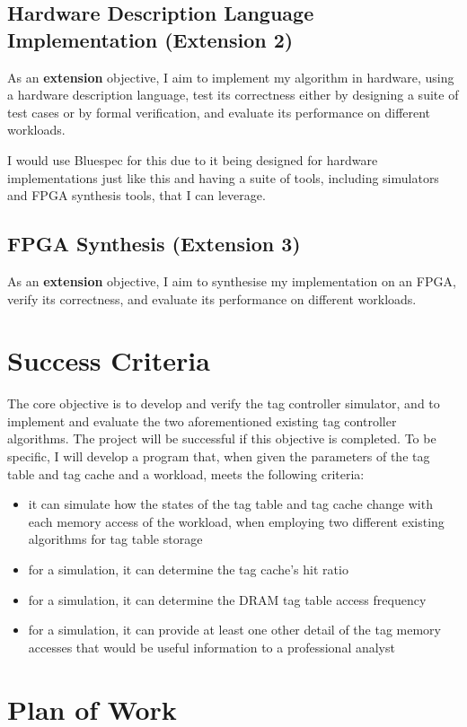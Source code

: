 \documentclass[10pt,a4paper]{article}
\begin{document}
\subsection*{Hardware Description Language Implementation (Extension 2)}
As an \textbf{extension} objective, I aim to implement my algorithm in hardware, using a hardware description language, test its correctness either by designing a suite of test cases or by formal verification, and evaluate its performance on different workloads.

I would use Bluespec for this due to it being designed for hardware implementations just like this and having a suite of tools, including simulators and FPGA synthesis tools, that I can leverage.

\subsection*{FPGA Synthesis (Extension 3)}
As an \textbf{extension} objective, I aim to synthesise my implementation on an FPGA, verify its correctness, and evaluate its performance on different workloads.


\section*{Success Criteria}
The core objective is to develop and verify the tag controller simulator, and to implement and evaluate the two aforementioned existing tag controller algorithms. The project will be successful if this objective is completed. To be specific, I will develop a program that, when given the parameters of the tag table and tag cache and a workload, meets the following criteria:
\begin{itemize}
	\item it can simulate how the states of the tag table and tag cache change with each memory access of the workload, when employing two different existing algorithms for tag table storage
	\item for a simulation, it can determine the tag cache's hit ratio
	\item for a simulation, it can determine the DRAM tag table access frequency
	\item for a simulation, it can provide at least one other detail of the tag memory accesses that would be useful information to a professional analyst
\end{itemize}

\section*{Plan of Work}
\end{document}
